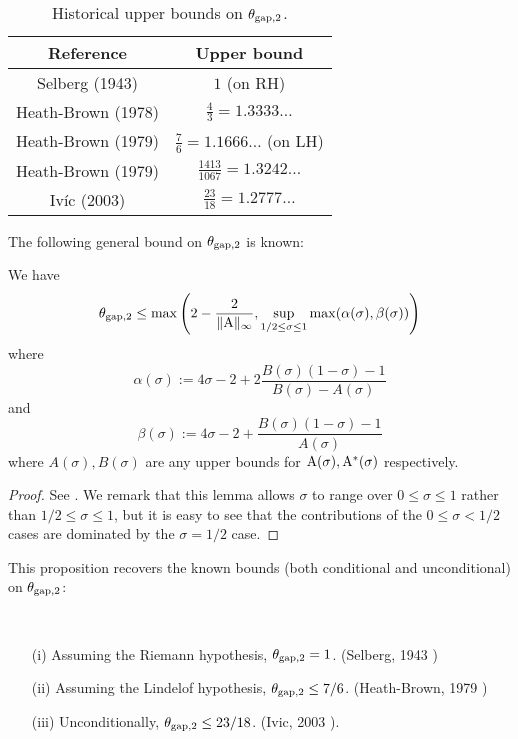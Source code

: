     \begin{table}[ht]
        \caption{Historical upper bounds on $\theta_{\mathrm{gap},2}$.}
        \centering
        \renewcommand{\arraystretch}{1.2}
        \begin{tabular}{|c|c|}
        \hline
        Reference & Upper bound \\
        \hline
        Selberg (1943) \cite{selberg_1943} & $1$ (on RH)\\
        \hline
        Heath-Brown (1978) \cite{heath_brown_consecutive_I} & $\frac{4}{3} = 1.3333\dots$\\
        \hline
        Heath-Brown (1979) \cite{heath_brown_consecutive_II} & $\frac{7}{6} = 1.1666\dots$ (on LH) \\
        \hline
        Heath-Brown (1979) \cite{heath_brown_consecutive_II} & $\frac{1413}{1067} = 1.3242\dots$ \\
        \hline
        Iv\'ic (2003) \cite[Theorem 12.14]{ivic} & $\frac{23}{18} = 1.2777\dots$ \\
        \hline
        \end{tabular}
        \end{table}\label{gapsquare-table}

The following general bound on $\theta_{\mathrm{gap},2}$ is known:

\begin{proposition}\label{gapsquare-from-a}
    We have
    $$ \theta_{\mathrm{gap},2} \leq \max\left( 2-\frac{2}{\|\mathrm{A}\|_\infty}, \sup_{1/2 \leq \sigma \leq 1} \max(\alpha(\sigma), \beta(\sigma))\right)$$
    where
    $$ \alpha(\sigma) := 4\sigma - 2 + 2 \frac{B(\sigma)(1-\sigma)-1}{B(\sigma)-A(\sigma)}$$
    and
    $$ \beta(\sigma) := 4\sigma - 2 + \frac{B(\sigma)(1-\sigma)-1}{A(\sigma)}$$
    where $A(\sigma), B(\sigma)$ are any upper bounds for $\mathrm{A}(\sigma), \mathrm{A}^*(\sigma)$ respectively.
\end{proposition}

\begin{proof} See \cite[Lemma 2]{heath_brown_consecutive_II}. We remark that this lemma allows $\sigma$ to range over $0 \leq \sigma \leq 1$ rather than $1/2 \leq \sigma \leq 1$, but it is easy to see that the contributions of the $0 \leq \sigma < 1/2$ cases are dominated by the $\sigma=1/2$ case.
\end{proof}

This proposition recovers the known bounds (both conditional and unconditional) on $\theta_{\mathrm{gap},2}$:

\begin{corollary}\
    \begin{itemize}
    \item[(i)] Assuming the Riemann hypothesis, $\theta_{\mathrm{gap},2} = 1$. (Selberg, 1943 \cite{selberg_1943})
    \item[(ii)] Assuming the Lindelof hypothesis, $\theta_{\mathrm{gap},2} \leq 7/6$. (Heath-Brown, 1979 \cite{heath_brown_consecutive_II})
    \item[(iii)] Unconditionally, $\theta_{\mathrm{gap},2} \leq 23/18$. (Ivic, 2003 \cite[Theorem 12.14]{ivic}).
\end{itemize}
\end{corollary}

